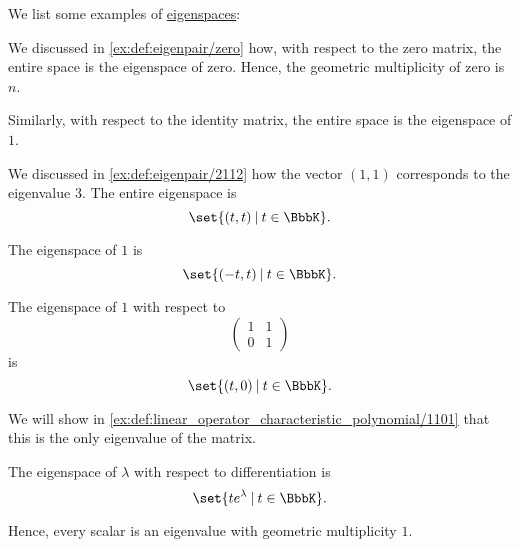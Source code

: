 \begin{example}\label{ex:def:eigenspace}
  We list some examples of \hyperref[def:eigenspace]{eigenspaces}:
  \begin{thmenum}
     We discussed in \cref{ex:def:eigenpair/zero} how, with respect to the zero matrix, the entire space is the eigenspace of zero. Hence, the geometric multiplicity of zero is \( n \).

     Similarly, with respect to the identity matrix, the entire space is the eigenspace of \( 1 \).

     We discussed in \cref{ex:def:eigenpair/2112} how the vector \( (1, 1) \) corresponds to the eigenvalue \( 3 \). The entire eigenspace is
    \begin{equation*}
      \set{ (t, t) \given t \in \BbbK }.
    \end{equation*}

    The eigenspace of \( 1 \) is
    \begin{equation*}
      \set{ (-t, t) \given t \in \BbbK }.
    \end{equation*}

     The eigenspace of \( 1 \) with respect to
    \begin{equation*}
      \begin{pmatrix}
        1 & 1 \\
        0 & 1
      \end{pmatrix}
    \end{equation*}
    is
    \begin{equation*}
      \set{ (t, 0) \given t \in \BbbK }.
    \end{equation*}

    We will show in \cref{ex:def:linear_operator_characteristic_polynomial/1101} that this is the only eigenvalue of the matrix.

     The eigenspace of \( \lambda \) with respect to differentiation is
    \begin{equation*}
      \set{ t e^\lambda \given t \in \BbbK }.
    \end{equation*}

    Hence, every scalar is an eigenvalue with geometric multiplicity \( 1 \).
  \end{thmenum}
\end{example}

